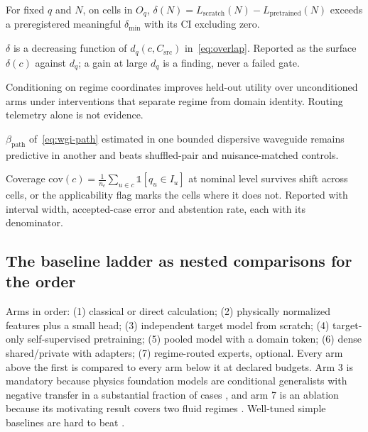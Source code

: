 \begin{hypothesis}
For fixed $q$ and $N$, on cells in $O_q$, $\delta(N)=L_{\mathrm{scratch}}(N)-L_{\mathrm{pretrained}}(N)$ exceeds a preregistered meaningful $\delta_{\min}$ with its CI excluding zero.
\end{hypothesis}
\begin{hypothesis}
$\delta$ is a decreasing function of $d_q(c,C_{\mathrm{src}})$ in~\eqref{eq:overlap}. Reported as the surface $\delta(c)$ against $d_q$; a gain at large $d_q$ is a finding, never a failed gate.
\end{hypothesis}
\begin{hypothesis}
Conditioning on regime coordinates improves held-out utility over unconditioned arms under interventions that separate regime from domain identity. Routing telemetry alone is not evidence.
\end{hypothesis}
\begin{hypothesis}[H4, mechanism]
$\beta_{\mathrm{path}}$ of~\eqref{eq:wgi-path} estimated in one bounded dispersive waveguide remains predictive in another and beats shuffled-pair and nuisance-matched controls.
\end{hypothesis}
\begin{hypothesis}
Coverage $\mathrm{cov}(c)=\frac1{n_c}\sum_{u\in c}\mathbb 1[q_u\in I_u]$ at nominal level survives shift across cells, or the applicability flag marks the cells where it does not. Reported with interval width, accepted-case error and abstention rate, each with its denominator.
\end{hypothesis}

\subsection[The baseline ladder as nested comparisons]{The baseline ladder as nested comparisons\hfill{\normalfont\small \tagG{} for the order}}

Arms in order: (1) classical or direct calculation; (2) physically normalized features plus a small head; (3) independent target model from scratch; (4) target-only self-supervised pretraining; (5) pooled model with a domain token; (6) dense shared/private with adapters; (7) regime-routed experts, optional. Every arm above the first is compared to every arm below it at declared budgets. Arm 3 is mandatory because physics foundation models are conditional generalists with negative transfer in a substantial fraction of cases \citep{chu2026}, and arm 7 is an ablation because its motivating result covers two fluid regimes \citep{sharma2026}. Well-tuned simple baselines are hard to beat \citep{gulrajani2020}.

